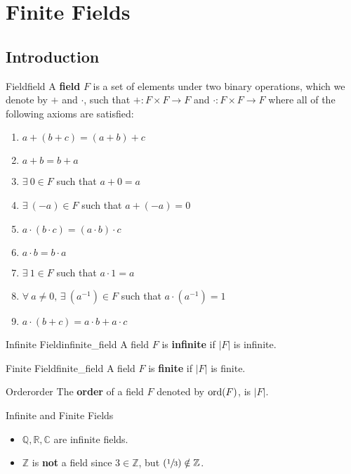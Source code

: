 \chapter{Finite Fields}

\section{Introduction}
\begin{Definition}{Field}{field}
    A \textbf{field} $ F $ is a set of elements under two binary operations,
    which we denote by $ + $ and $ \cdot $, such that
    $ {+\colon F\times F\to F} $ and $ {\cdot\colon F\times F\to F} $
    where all of the following axioms are satisfied:
    \begin{enumerate}[label=V\arabic*]
        \item $ a+(b+c)=(a+b)+c $
        \item $ a+b=b+a $
        \item $ \exists\ 0\in F $ such that $ a+0=a $
        \item $ \exists\ (-a)\in F $ such that $ a+(-a)=0 $
        \item $ a\cdot (b\cdot c)=(a\cdot b)\cdot c $
        \item $ a\cdot b=b\cdot a $
        \item $ \exists\ 1\in F $ such that $ a\cdot 1=a $
        \item $ \forall\ a\neq 0,\,\exists\ (a^{-1})\in F $ such that
              $ a\cdot (a^{-1})=1 $
        \item $ a\cdot (b+c)=a\cdot b+a\cdot c $
    \end{enumerate}
\end{Definition}

\begin{Definition}{Infinite Field}{infinite_field}
    A field $ F $ is \textbf{infinite} if $ |F| $ is infinite.
\end{Definition}

\begin{Definition}{Finite Field}{finite_field}
    A field $ F $ is \textbf{finite} if $ |F| $ is finite.
\end{Definition}

\begin{Definition}{Order}{order}
    The \textbf{order} of a field $ F $ denoted by $ \operatorname{ord}(F) $, is $ |F| $.
\end{Definition}

\begin{Example}{Infinite and Finite Fields}{}
    \begin{itemize}
        \item $ \mathbb{Q},\mathbb{R},\mathbb{C} $ are infinite fields.
        \item $ \mathbb{Z} $ is \textbf{not} a field since $ 3\in\mathbb{Z} $, but
              $ (\sfrac{1}{3})\notin\mathbb{Z} $.
    \end{itemize}
\end{Example}

